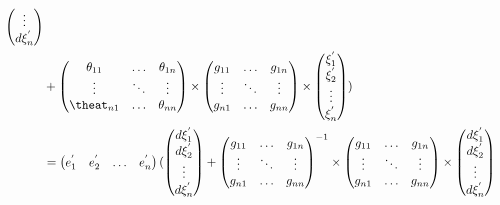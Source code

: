 \documentclass[a4paper,10pt]{amsart}
\begin{document}
\begin{align*}
\begin{pmatrix}
       \vdots\\
       d\xi_{n}^{'}
   \end{pmatrix} \\
   & +
    \begin{pmatrix}
       \theta_{11} & \ldots & \theta_{1n}\\
       \vdots      & \ddots & \vdots \\
       \theat_{n1} & \ldots & \theta_{nn}
   \end{pmatrix} \times
    \begin{pmatrix}
       g_{11} & \ldots & g_{1n}\\
       \vdots      & \ddots & \vdots \\
       g_{n1} & \ldots & g_{nn}
   \end{pmatrix} \times
    \begin{pmatrix}
       \xi_{1}^{'}\\
       \xi_{2}^{'}\\
       \vdots\\
       \xi_{n}^{'}
   \end{pmatrix}
    ) \\
    &=
    \begin{pmatrix}
        e_{1}^{'} & e_{2}^{'} & \ldots & e_{n}^{'} 
    \end{pmatrix} (
    \begin{pmatrix}
       d\xi_{1}^{'}\\
       d\xi_{2}^{'}\\
       \vdots\\
       d\xi_{n}^{'}
   \end{pmatrix} + 
    \begin{pmatrix}
       g_{11} & \ldots & g_{1n}\\
       \vdots      & \ddots & \vdots \\
       g_{n1} & \ldots & g_{nn}
    \end{pmatrix}^{-1} \times 
    \begin{pmatrix}
       g_{11} & \ldots & g_{1n}\\
       \vdots      & \ddots & \vdots \\
       g_{n1} & \ldots & g_{nn}
   \end{pmatrix} \times
    \begin{pmatrix}
       d\xi_{1}^{'}\\
       d\xi_{2}^{'}\\
       \vdots\\
       d\xi_{n}^{'}
   \end{pmatrix} \\

\end{align*}
\end{document}

